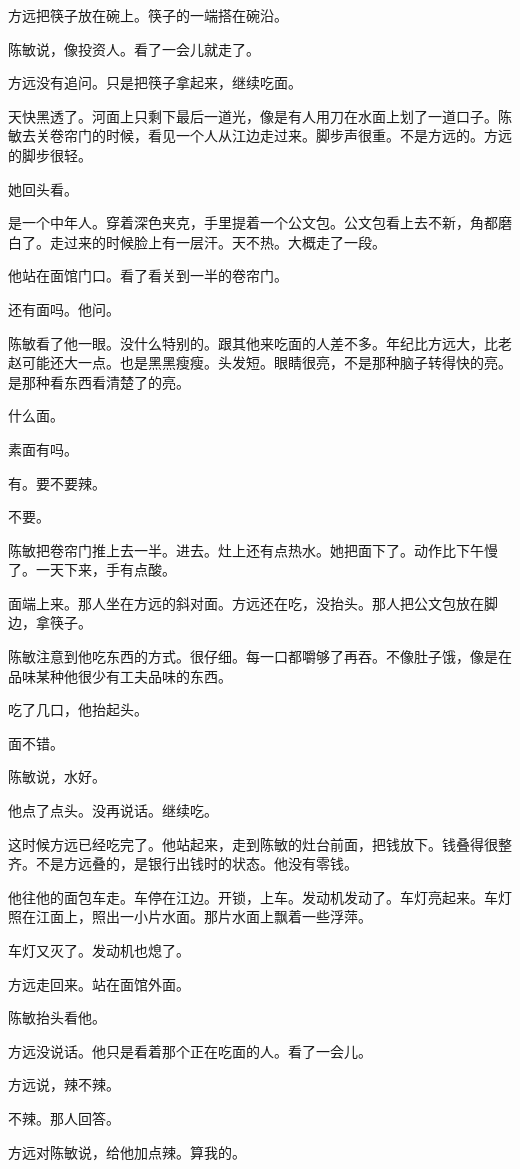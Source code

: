 \documentclass[UTF8,a5paper,11pt,openany]{ctexbook}
\begin{document}
方远把筷子放在碗上。筷子的一端搭在碗沿。

陈敏说，像投资人。看了一会儿就走了。

方远没有追问。只是把筷子拿起来，继续吃面。

天快黑透了。河面上只剩下最后一道光，像是有人用刀在水面上划了一道口子。陈敏去关卷帘门的时候，看见一个人从江边走过来。脚步声很重。不是方远的。方远的脚步很轻。

她回头看。

是一个中年人。穿着深色夹克，手里提着一个公文包。公文包看上去不新，角都磨白了。走过来的时候脸上有一层汗。天不热。大概走了一段。

他站在面馆门口。看了看关到一半的卷帘门。

还有面吗。他问。

陈敏看了他一眼。没什么特别的。跟其他来吃面的人差不多。年纪比方远大，比老赵可能还大一点。也是黑黑瘦瘦。头发短。眼睛很亮，不是那种脑子转得快的亮。是那种看东西看清楚了的亮。

什么面。

素面有吗。

有。要不要辣。

不要。

陈敏把卷帘门推上去一半。进去。灶上还有点热水。她把面下了。动作比下午慢了。一天下来，手有点酸。

面端上来。那人坐在方远的斜对面。方远还在吃，没抬头。那人把公文包放在脚边，拿筷子。

陈敏注意到他吃东西的方式。很仔细。每一口都嚼够了再吞。不像肚子饿，像是在品味某种他很少有工夫品味的东西。

吃了几口，他抬起头。

面不错。

陈敏说，水好。

他点了点头。没再说话。继续吃。

这时候方远已经吃完了。他站起来，走到陈敏的灶台前面，把钱放下。钱叠得很整齐。不是方远叠的，是银行出钱时的状态。他没有零钱。

他往他的面包车走。车停在江边。开锁，上车。发动机发动了。车灯亮起来。车灯照在江面上，照出一小片水面。那片水面上飘着一些浮萍。

车灯又灭了。发动机也熄了。

方远走回来。站在面馆外面。

陈敏抬头看他。

方远没说话。他只是看着那个正在吃面的人。看了一会儿。

方远说，辣不辣。

不辣。那人回答。

方远对陈敏说，给他加点辣。算我的。
\end{document}
